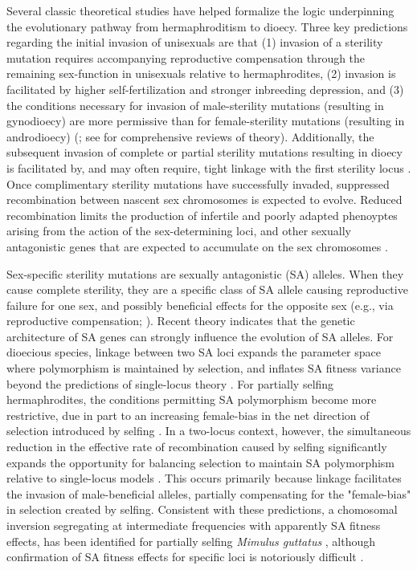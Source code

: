 \documentclass[9pt,twocolumn,twoside,lineno]{gsajnl}
\begin{document}
Several classic theoretical studies have helped formalize the logic underpinning the evolutionary pathway from hermaphroditism to dioecy. Three key predictions regarding the initial invasion of unisexuals are that (1) invasion of a sterility mutation requires accompanying reproductive compensation through the remaining sex-function in unisexuals relative to hermaphrodites, (2) invasion is facilitated by higher self-fertilization and stronger inbreeding depression, and (3) the conditions necessary for invasion of male-sterility mutations (resulting in gynodioecy) are more permissive than for female-sterility mutations (resulting in androdioecy) (\citealt{Lewis1941,Lloyd1975,Lloyd1976,Charlesworth1978a}; see \citealt{Charlesworth1999,Charlesworth2006} for comprehensive reviews of theory). Additionally, the subsequent invasion of complete or partial sterility mutations resulting in dioecy is facilitated by, and may often require, tight linkage with the first sterility locus \citep{Charlesworth1978a}. Once complimentary sterility mutations have successfully invaded, suppressed recombination between nascent sex chromosomes is expected to evolve. Reduced recombination limits the production of infertile and poorly adapted phenoyptes arising from the action of the sex-determining loci, and other sexually antagonistic genes that are expected to accumulate on the sex chromosomes \citep{Charlesworth2002,Bachtrog2006}. 

Sex-specific sterility mutations are sexually antagonistic (SA) alleles. When they cause complete sterility, they are a specific class of SA allele causing reproductive failure for one sex, and possibly beneficial effects for the opposite sex (e.g., via reproductive compensation; \citealt{Lewis1941,Lloyd1975,Charlesworth1978a}). Recent theory indicates that the genetic architecture of SA genes can strongly influence the evolution of SA alleles. For dioecious species, linkage between two SA loci expands the parameter space where polymorphism is maintained by selection, and inflates SA fitness variance beyond the predictions of single-locus theory \citep{Kidwell1977,Patten2010,UbedaPatten2010}. For partially selfing hermaphrodites, the conditions permitting SA polymorphism become more restrictive, due in part to an increasing female-bias in the net direction of selection introduced by selfing \citep{JordanConnallon2014}. In a two-locus context, however, the simultaneous reduction in the effective rate of recombination caused by selfing significantly expands the opportunity for balancing selection to maintain SA polymorphism relative to single-locus models \citep{Olito2017}. This occurs primarily because linkage facilitates the invasion of male-beneficial alleles, partially compensating for the "female-bias" in selection created by selfing. Consistent with these predictions, a chomosomal inversion segregating at intermediate frequencies with apparently SA fitness effects, has been identified for partially selfing \textit{Mimulus guttatus} \citep{LeeKelly2015}, although confirmation of SA fitness effects for specific loci is notoriously difficult \citep{ConnallonClark2012,Barson2015}.
\end{document}

